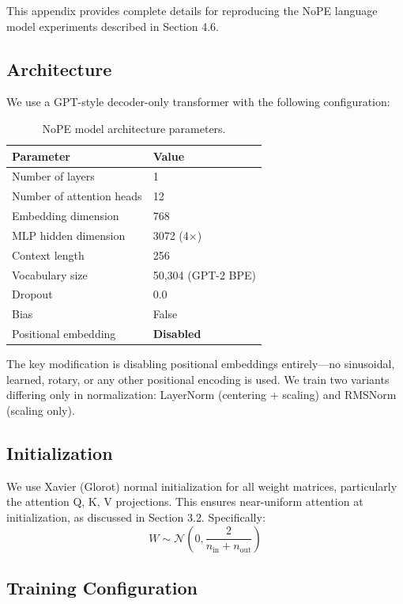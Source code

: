 \documentclass[11pt]{article}
\begin{document}
This appendix provides complete details for reproducing the NoPE language model experiments described in Section 4.6.

\subsection{Architecture}

We use a GPT-style decoder-only transformer with the following configuration:

\begin{table}[htbp]
\centering
\small
\begin{tabular}{ll}
\toprule
\textbf{Parameter} & \textbf{Value} \\
\midrule
Number of layers & 1 \\
Number of attention heads & 12 \\
Embedding dimension & 768 \\
MLP hidden dimension & 3072 (4$\times$) \\
Context length & 256 \\
Vocabulary size & 50,304 (GPT-2 BPE) \\
Dropout & 0.0 \\
Bias & False \\
Positional embedding & \textbf{Disabled} \\
\bottomrule
\end{tabular}
\caption{NoPE model architecture parameters.}
\label{tab:nope-arch}
\end{table}

The key modification is disabling positional embeddings entirely---no sinusoidal, learned, rotary, or any other positional encoding is used. We train two variants differing only in normalization: LayerNorm (centering + scaling) and RMSNorm (scaling only).

\subsection{Initialization}

We use Xavier (Glorot) normal initialization for all weight matrices, particularly the attention Q, K, V projections. This ensures near-uniform attention at initialization, as discussed in Section 3.2. Specifically:
\begin{equation}
W \sim \mathcal{N}\left(0, \frac{2}{n_{\text{in}} + n_{\text{out}}}\right)
\end{equation}

\subsection{Training Configuration}
\end{document}
